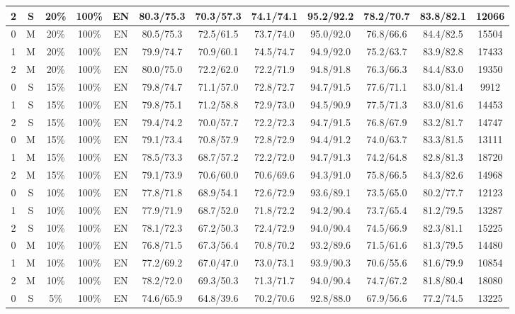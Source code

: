 \begin{table*}
{\begin{tabular}{|c|c|c|c|c||c|c|c|c|c|c||c|}
2 & S & 20\% & 100\% & EN & 80.3/75.3 & 70.3/57.3 & 74.1/74.1 & 95.2/92.2 & 78.2/70.7 & 83.8/82.1 & 12066 \\ \hline
0 & M & 20\% & 100\% & EN & 80.5/75.3 & 72.5/61.5 & 73.7/74.0 & 95.0/92.0 & 76.8/66.6 & 84.4/82.5 & 15504 \\ \hline
1 & M & 20\% & 100\% & EN & 79.9/74.7 & 70.9/60.1 & 74.5/74.7 & 94.9/92.0 & 75.2/63.7 & 83.9/82.8 & 17433 \\ \hline
2 & M & 20\% & 100\% & EN & 80.0/75.0 & 72.2/62.0 & 72.2/71.9 & 94.8/91.8 & 76.3/66.3 & 84.4/83.0 & 19350 \\ \hline
0 & S & 15\% & 100\% & EN & 79.8/74.7 & 71.1/57.0 & 72.8/72.7 & 94.7/91.5 & 77.6/71.1 & 83.0/81.4 & 9912 \\ \hline
1 & S & 15\% & 100\% & EN & 79.8/75.1 & 71.2/58.8 & 72.9/73.0 & 94.5/90.9 & 77.5/71.3 & 83.0/81.6 & 14453 \\ \hline
2 & S & 15\% & 100\% & EN & 79.4/74.2 & 70.0/57.7 & 72.2/72.3 & 94.7/91.5 & 76.8/67.9 & 83.2/81.7 & 14747 \\ \hline
0 & M & 15\% & 100\% & EN & 79.1/73.4 & 70.8/57.9 & 72.8/72.9 & 94.4/91.2 & 74.0/63.7 & 83.3/81.5 & 13111 \\ \hline
1 & M & 15\% & 100\% & EN & 78.5/73.3 & 68.7/57.2 & 72.2/72.0 & 94.7/91.3 & 74.2/64.8 & 82.8/81.3 & 18720 \\ \hline
2 & M & 15\% & 100\% & EN & 79.1/73.9 & 70.6/60.0 & 70.6/69.6 & 94.3/91.0 & 75.8/66.5 & 84.3/82.6 & 14968 \\ \hline
0 & S & 10\% & 100\% & EN & 77.8/71.8 & 68.9/54.1 & 72.6/72.9 & 93.6/89.1 & 73.5/65.0 & 80.2/77.7 & 12123 \\ \hline
1 & S & 10\% & 100\% & EN & 77.9/71.9 & 68.7/52.0 & 71.8/72.2 & 94.2/90.4 & 73.7/65.4 & 81.2/79.5 & 13287 \\ \hline
2 & S & 10\% & 100\% & EN & 78.1/72.3 & 67.2/50.3 & 72.4/72.9 & 94.0/90.4 & 74.5/66.9 & 82.3/81.1 & 15225 \\ \hline
0 & M & 10\% & 100\% & EN & 76.8/71.5 & 67.3/56.4 & 70.8/70.2 & 93.2/89.6 & 71.5/61.6 & 81.3/79.5 & 14480 \\ \hline
1 & M & 10\% & 100\% & EN & 77.2/69.2 & 67.0/47.0 & 73.0/73.1 & 93.9/90.3 & 70.6/55.6 & 81.6/79.9 & 10854 \\ \hline
2 & M & 10\% & 100\% & EN & 78.2/72.0 & 69.3/50.3 & 71.3/71.7 & 94.0/90.4 & 74.7/67.2 & 81.8/80.4 & 18080 \\ \hline
0 & S & 5\% & 100\% & EN & 74.6/65.9 & 64.8/39.6 & 70.2/70.6 & 92.8/88.0 & 67.9/56.6 & 77.2/74.5 & 13225 \\ \hline

\end{tabular}}
\end{table*}

